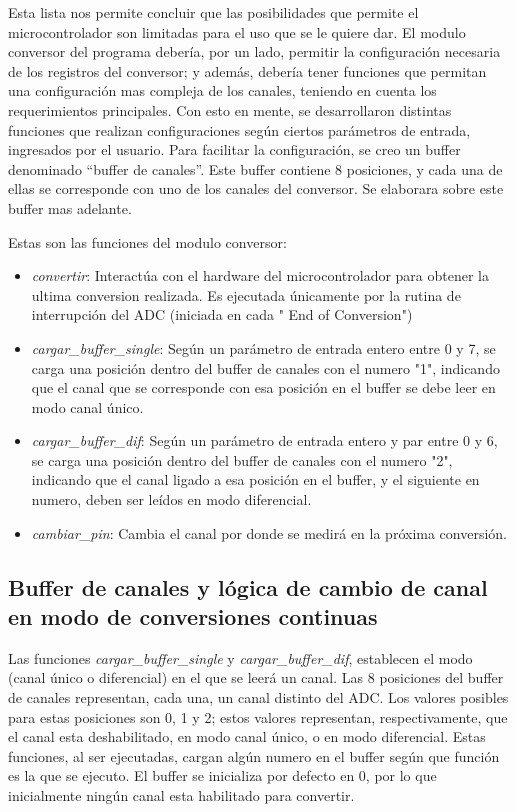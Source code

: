 Esta lista nos permite concluir que las posibilidades que permite el microcontrolador son limitadas para el uso que se le quiere dar. El modulo conversor del programa debería, por un lado, permitir la configuración necesaria de los registros del conversor; y además, debería tener funciones que permitan una configuración mas compleja de los canales, teniendo en cuenta los requerimientos principales.
Con esto en mente, se desarrollaron distintas funciones que realizan configuraciones según ciertos parámetros de entrada, ingresados por el usuario. Para facilitar la configuración, se creo un buffer denominado ``buffer de canales''. Este buffer contiene 8 posiciones, y cada una de ellas se corresponde con uno de los canales del conversor. Se elaborara sobre este buffer mas adelante.

Estas son las funciones del modulo conversor:

\begin{itemize}
  \item \textit{convertir}: Interactúa con el hardware del microcontrolador para obtener la ultima conversion realizada. Es ejecutada únicamente por la rutina de interrupción del ADC (iniciada en cada " End of Conversion")
  \item \textit{cargar\_buffer\_single}: Según un parámetro de entrada entero entre 0 y 7, se carga una posición dentro del buffer de canales con el numero "1", indicando que el canal que se corresponde con esa posición en el buffer se debe leer en modo canal único.
  \item \textit{cargar\_buffer\_dif}: Según un parámetro de entrada entero y par entre 0 y 6, se carga una posición dentro del buffer de canales con el numero "2", indicando que el canal ligado a esa posición en el buffer, y el siguiente en numero, deben ser leídos en modo diferencial.
  \item \textit{cambiar\_pin}: Cambia el canal por donde se medirá en la próxima conversión.
\end{itemize}

\subsection{Buffer de canales y lógica de cambio de canal en modo de conversiones continuas} %
\label{it2:sub:buffer_de_canales_y_logica_de_cambio_de_canal_en_modo_de_conversiones_continuas}

Las funciones \textit{cargar\_buffer\_single} y \textit{cargar\_buffer\_dif}, establecen el modo (canal único o diferencial) en el que se leerá un canal. Las 8 posiciones del buffer de canales representan, cada una, un canal distinto del ADC. Los valores posibles para estas posiciones son 0, 1 y 2; estos valores representan, respectivamente, que el canal esta deshabilitado, en modo canal único, o en modo diferencial. Estas funciones, al ser ejecutadas, cargan algún numero en el buffer según que función es la que se ejecuto. El buffer se inicializa por defecto en 0, por lo que inicialmente ningún canal esta habilitado para convertir. \\

